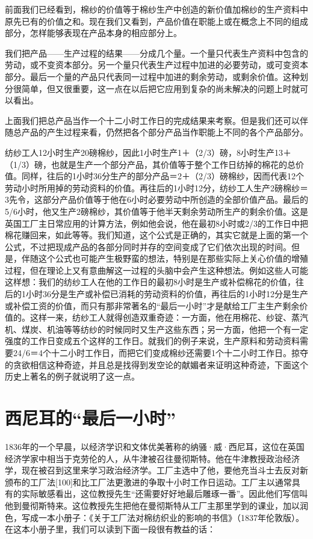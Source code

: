 \documentclass{ctexbook}
\begin{document}
    前面我们已经看到，棉纱的价值等于棉纱生产中创造的新价值加棉纱的生产资料中原先已有的价值之和。现在我们又看到，产品价值在职能上或在概念上不同的组成部分，怎样能够表现在产品本身的相应部分上。

    我们把产品——生产过程的结果——分成几个量。一个量只代表生产资料中包含的劳动，或不变资本部分。另一个量只代表生产过程中加进的必要劳动，或可变资本部分。最后一个量的产品只代表同一过程中加进的剩余劳动，或剩余价值。这种划分很简单，但又很重要，这一点在以后把它应用到复杂的尚未解决的问题上时就可以看出。

    上面我们把总产品当作一个十二小时工作日的完成结果来考察。但是我们还可以伴随总产品的产生过程来看，仍然把各个部分产品当作职能上不同的各个产品部分。

    纺纱工人12小时生产20磅棉纱，因此1小时生产1＋（2/3）磅，8小时生产13＋（1/3）磅，也就是生产一个部分产品，其价值等于整个工作日纺掉的棉花的总价值。同样，往后的1小时36分生产的部分产品＝2＋（2/3）磅棉纱，因而代表12个劳动小时所用掉的劳动资料的价值。再往后的1小时12分，纺纱工人生产2磅棉纱＝3先令，这部分产品价值等于他在6小时必要劳动中所创造的全部价值产品。最后的5/6小时，他又生产2磅棉纱，其价值等于他半天剩余劳动所生产的剩余价值。这是英国工厂主日常应用的计算方法，例如他会说，他在最初8小时或2/3的工作日中把棉花赚回来，如此等等。我们知道，这个公式是正确的，其实它就是上面的第一个公式，不过把现成产品的各部分同时并存的空间变成了它们依次出现的时间。但是，伴随这个公式也可能产生极野蛮的想法，特别是在那些实际上关心价值的增殖过程，但在理论上又有意曲解这一过程的头脑中会产生这种想法。例如这些人可能这样想：我们的纺纱工人在他的工作日的最初8小时是生产或补偿棉花的价值，往后的1小时36分是生产或补偿已消耗的劳动资料的价值，再往后的1小时12分是生产或补偿工资的价值，而只有那非常著名的“最后一小时”才是献给工厂主生产剩余价值的。这样一来，纺纱工人就得创造双重奇迹：一方面，他在用棉花、纱锭、蒸汽机、煤炭、机油等等纺纱的时候同时又生产这些东西；另一方面，他把一个有一定强度的工作日变成五个这样的工作日。就我们的例子来说，生产原料和劳动资料需要24/6＝4个十二小时工作日，而把它们变成棉纱还需要1个十二小时工作日。掠夺的贪欲相信这种奇迹，并且总是找得到发空论的献媚者来证明这种奇迹，下面这个历史上著名的例子就说明了这一点。

    \section{西尼耳的“最后一小时”}

    1836年的一个早晨，以经济学识和文体优美著称的纳骚·威·西尼耳，这位在英国经济学家中相当于克劳伦的人，从牛津被召往曼彻斯特。他在牛津教授政治经济学，现在被召到这里来学习政治经济学。工厂主选中了他，要他充当斗士去反对新颁布的工厂法[100]和比工厂法更激进的争取十小时工作日运动。工厂主以通常具有的实际敏感看出，这位教授先生“还需要好好地最后雕琢一番”。因此他们写信叫他到曼彻斯特来。这位教授先生把他在曼彻斯特从工厂主那里学到的课业，加以润色，写成一本小册子：《关于工厂法对棉纺织业的影响的书信》（1837年伦敦版）。在这本小册子里，我们可以读到下面一段很有教益的话：
\end{document}
